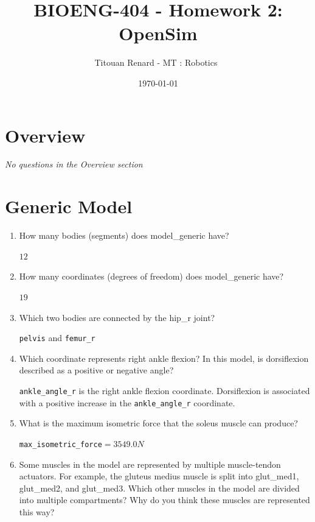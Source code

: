 \documentclass[11pt]{article}
\title{BIOENG-404 - Homework 2: OpenSim}
\author{
    Titouan Renard
    - MT : Robotics 
}
\date{\today}
\begin{document}
\maketitle

\section{Overview}
\begin{adjustwidth}{0.5cm}{}
    \textit{No questions in the Overview section}
\end{adjustwidth}
\section{Generic Model}

\begin{enumerate}
    \item How many bodies (segments) does model\_generic have?
    \begin{adjustwidth}{0.5cm}{}
        $12$
    \end{adjustwidth}
    \item How many coordinates (degrees of freedom) does model\_generic have?
    \begin{adjustwidth}{0.5cm}{}
        $19$
    \end{adjustwidth}
    \item Which two bodies are connected by the hip\_r joint?
    \begin{adjustwidth}{0.5cm}{}
        \texttt{pelvis} and \texttt{femur\_r}
    \end{adjustwidth}
    \item Which coordinate represents right ankle flexion? In this model, is dorsiflexion described as a positive or negative angle?
    \begin{adjustwidth}{0.5cm}{}
        \texttt{ankle\_angle\_r} is the right ankle flexion coordinate. Dorsiflexion is associated with a positive increase in the \texttt{ankle\_angle\_r} coordinate.
    \end{adjustwidth}
    \item What is the maximum isometric force that the soleus muscle can produce?
    \begin{adjustwidth}{0.5cm}{}
        \texttt{max\_isometric\_force}$=3549.0N$
    \end{adjustwidth}
    \item Some muscles in the model are represented by multiple muscle-tendon actuators. For example, the gluteus medius muscle is split into glut\_med1, glut\_med2, and glut\_med3. Which other muscles in the model are divided into multiple compartments? Why do you think these muscles are represented this way?

\end{enumerate}
\end{document}
